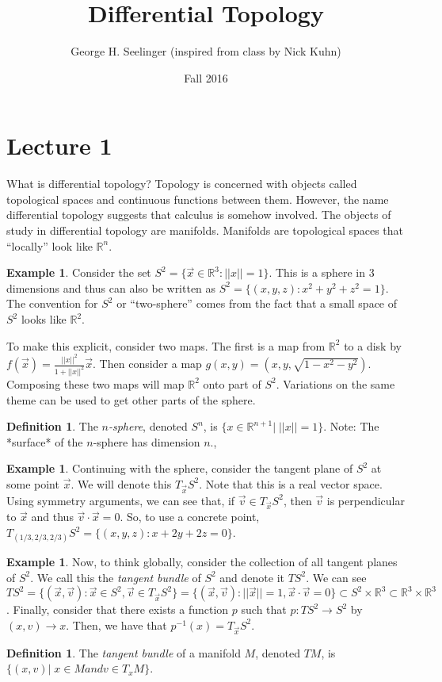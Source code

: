 \documentclass[11pt,leqno,oneside]{amsart}
\title[Differential Topology]{Differential Topology}
\author{George H. Seelinger (inspired from class by Nick Kuhn)}
\date{Fall 2016}
\newcommand{\R}{{\mathbb R}} %
\theoremstyle{definition}
\newtheorem{defn}[thm]{Definition}
\newtheorem{example}[thm]{Example}
\numberwithin{equation}{section}
\begin{document}
\maketitle
\section{Lecture 1}

What is differential topology? Topology is concerned with objects called
topological spaces and continuous functions between them. However, the name
differential topology suggests that calculus is somehow involved. The objects of
study in differential topology are manifolds. Manifolds are topological spaces
that ``locally'' look like $\R^n$.

\begin{example}
	Consider the set $S^2 = \{ \vec{x} \in \R^3: ||x||=1\}$. This is a sphere
	in 3 dimensions and thus can also be written as $S^2 = \{(x,y,z) :
	x^2+y^2+z^2=1\}$. The convention for $S^2$ or ``two-sphere'' comes from the
	fact that a small space of $S^2$ looks like $\R^2$.

	To make this explicit, consider two maps. The first is a map from $\R^2$ to
	a disk by $f(\vec{x}) = \frac{||x||^2}{1+||x||^2} \vec{x}$. Then consider a
	map $g(x,y) = (x,y,\sqrt{1-x^2-y^2})$. Composing these two maps will map
	$\R^2$ onto part of $S^2$. Variations on the same theme can be used to get
	other parts of the sphere.
\end{example}
\begin{defn}
	The \emph{$n$-sphere}, denoted $S^n$, is $\{x \in \R^{n+1} |\; ||x||=1 \}$. Note: The *surface* of the $n$-sphere has dimension $n$.,
\end{defn}
\begin{example}
	Continuing with the sphere, consider the tangent plane of $S^2$ at some
	point $\vec{x}$. We will denote this $T_{\vec{x}}S^2$. Note that this is a
	real vector space. Using symmetry arguments, we can see that, if $\vec{v}
	\in T_{\vec{x}}S^2$, then $\vec{v}$ is perpendicular to $\vec{x}$ and thus
	$\vec{v} \cdot \vec{x} = 0$. So, to use a concrete point,
	$T_{(1/3,2/3,2/3)} S^2 = \{(x,y,z) : x+2y+2z=0\}$.
\end{example}
\begin{example}
	Now, to think globally, consider the collection of all tangent planes of
	$S^2$. We call this the \emph{tangent bundle} of $S^2$ and denote it
	$TS^2$. We can see $TS^2 = \{(\vec{x}, \vec{v}): \vec{x} \in S^2, \vec{v}
	\in T_{\vec{x}} S^2\} = \{(\vec{x},\vec{v}) : ||\vec{x}|| = 1, \vec{x}
	\cdot \vec{v} = 0\} \subset S^2 \times \R^3 \subset \R^3 \times \R^3$.
	Finally, consider that there exists a function $p$ such that $p: TS^2 \to
	S^2$ by $(x,v) \to x$. Then, we have that $p^{-1}(x) = T_{\vec{x}}S^2$.
\end{example}
\begin{defn}
	The \emph{tangent bundle} of a manifold $M$, denoted $TM$, is $\{ (x,v) |\; x \in M and v \in T_xM \}$.
\end{defn}
\end{document}
